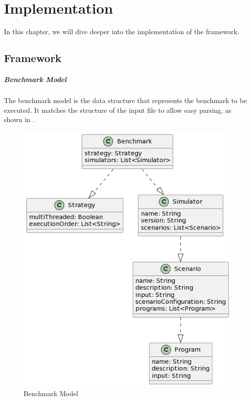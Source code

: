\documentclass[12pt,a4paper,openright,twoside]{book}
\begin{document}
\chapter{Implementation}

In this chapter, we will dive deeper into the implementation of the framework.

\section{Framework}

\paragraph*{Benchmark Model}
The benchmark model is the data structure that represents the benchmark to be executed.
It matches the structure of the input file to allow easy parsing, as shown in .

\begin{figure}[h!]
  \centering
  \includegraphics[width=\textwidth]{figures/benchmark-model.png}
  \caption{Benchmark Model}
  \label{fig:benchmark-model}
\end{figure}
\end{document}
